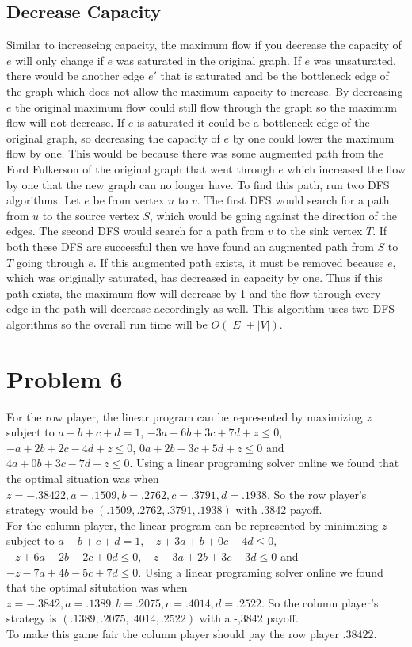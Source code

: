 \documentclass[11pt]{article}
\begin{document}
\subsection*{Decrease Capacity}
Similar to increaseing capacity, the maximum flow if you decrease the capacity of $e$ will only change if $e$ was saturated in the original graph. If $e$ was unsaturated, there would be another edge $e'$ that is saturated and be the bottleneck edge of the graph which does not allow the maximum capacity to increase. By decreasing $e$ the original maximum flow could still flow through the graph so the maximum flow will not decrease. If $e$ is saturated it could be a bottleneck edge of the original graph, so decreasing the capacity of $e$ by one could lower the maximum flow by one. This would be because there was some augmented path from the Ford Fulkerson of the original graph that went through $e$ which increased the flow by one that the new graph can no longer have. To find this path, run two DFS algorithms. Let $e$ be from vertex $u$ to $v$. The first DFS would search for a path from $u$ to the source vertex $S$, which would be going against the direction of the edges. The second DFS would search for a path from $v$ to the sink vertex $T$. If both these DFS are successful then we have found an augmented path from $S$ to $T$ going through $e$. If this augmented path exists, it must be removed because $e$, which was originally saturated, has decreased in capacity by one. Thus if this path exists, the maximum flow will decrease by 1 and the flow through every edge in the path will decrease accordingly as well. This algorithm uses two DFS algorithms so the overall run time will be $O(|E|+|V|)$. 

\section*{Problem 6}
For the row player, the linear program can be represented by maximizing $z$ subject to $a+b+c+d = 1$, $-3a-6b+3c+7d+z \leq 0$, $-a+2b+2c-4d+z \leq 0$, $0a+2b-3c+5d+z \leq 0$ and $4a+0b+3c-7d+z \leq 0$. Using a linear programing solver online we found that the optimal situation was when $z = -.38422, a = .1509, b=.2762, c= .3791, d =.1938$. So the row player's strategy would be $(.1509, .2762, .3791, .1938)$ with .3842 payoff.\\
For the column player, the linear program can be represented by minimizing $z$ subject to $a+b+c+d = 1$, $-z+3a+b+0c-4d \leq 0$, $-z+6a-2b-2c+0d \leq 0$, $-z-3a+2b+3c-3d \leq 0$ and $-z-7a+4b-5c+7d \leq 0$. Using a linear programing solver online we found that the optimal situtation was when $z=-.3842, a=.1389, b=.2075, c=.4014, d=.2522$. So the column player's strategy is $(.1389, .2075, .4014, .2522)$ with a -,3842 payoff.\\
To make this game fair the column player should pay the row player $.38422$. 
\end{document}
